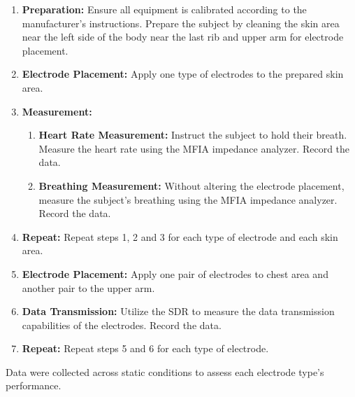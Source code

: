 \documentclass[conference]{IEEEtran}
\newcommand{\notea}[1]{\textcolor{blue}{Armands: #1}}
\begin{document}
\begin{enumerate}
    \item \textbf{Preparation:} Ensure all equipment is calibrated according to the manufacturer's instructions. Prepare the subject by cleaning the skin area near the left side of the body near the last rib and upper arm for electrode placement.
    \item \textbf{Electrode Placement:} Apply one type of electrodes to the prepared skin area.
    \item \textbf{Measurement:}
    \begin{enumerate}
        \item \textbf{Heart Rate Measurement:} Instruct the subject to hold their breath. Measure the heart rate using the MFIA impedance analyzer. Record the data.
        \item \textbf{Breathing Measurement:} Without altering the electrode placement, measure the subject's breathing using the MFIA impedance analyzer. Record the data.
        
    \end{enumerate}

    \item \textbf{Repeat:} Repeat steps 1, 2 and 3 for each type of electrode and each skin area.
    \item \textbf{Electrode Placement:} Apply one pair of electrodes to chest area and another pair to the upper arm.
    \item \textbf{Data Transmission:} Utilize the \gls{SDR} to measure the data transmission capabilities of the electrodes. Record the data.
    \item \textbf{Repeat:} Repeat steps 5 and 6 for each type of electrode.
\end{enumerate}

Data were collected across static conditions to assess each electrode type's performance.




    
\end{document}
